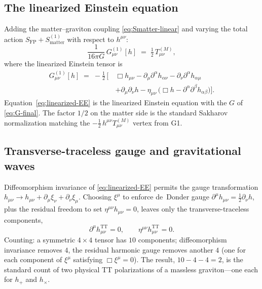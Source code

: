 \documentclass[11pt]{article}
\begin{document}
\subsection{The linearized Einstein equation}

Adding the matter--graviton coupling \eqref{eq:Smatter-linear} and
varying the total action $S_{\mathrm{FP}} +
S_{\mathrm{matter}}^{(1)}$ with respect to $h^{\mu\nu}$:
\begin{equation}
  \frac{1}{16\pi G}\,G^{(1)}_{\mu\nu}[h]
   \;=\;
   \tfrac{1}{2}\,T^{(M)}_{\mu\nu},
  \label{eq:linearized-EE}
\end{equation}
where the linearized Einstein tensor is
\begin{align}
  G^{(1)}_{\mu\nu}[h]
   \;=\; -\tfrac{1}{2}\,\Big[\,
     &\Box h_{\mu\nu}
     - \partial_\mu\partial^\alpha h_{\alpha\nu}
     - \partial_\nu\partial^\alpha h_{\alpha\mu} \nonumber\\
     & + \partial_\mu\partial_\nu h
     - \eta_{\mu\nu}\,\bigl(\Box h - \partial^\alpha\partial^\beta h_{\alpha\beta}\bigr)
   \Big].
   \label{eq:G-linear}
\end{align}
Equation~\eqref{eq:linearized-EE} is the linearized Einstein
equation with the $G$ of \eqref{eq:G-final}.  The factor $1/2$
on the matter side is the standard Sakharov normalization
matching the $-\tfrac{1}{2}\,h^{\mu\nu} T^{(M)}_{\mu\nu}$ vertex
from G1.

\subsection{Transverse-traceless gauge and gravitational waves}

Diffeomorphism invariance of \eqref{eq:linearized-EE} permits the
gauge transformation $h_{\mu\nu} \to h_{\mu\nu}
+ \partial_\mu \xi_\nu + \partial_\nu \xi_\mu$.  Choosing $\xi^\mu$
to enforce de~Donder gauge $\partial^\mu h_{\mu\nu} = \tfrac{1}{2}
\partial_\nu h$, plus the residual freedom to set
$\eta^{\mu\nu} h_{\mu\nu} = 0$, leaves only the
transverse-traceless components,
\begin{equation}
  \partial^\mu h^{\mathrm{TT}}_{\mu\nu} = 0,
  \qquad
  \eta^{\mu\nu} h^{\mathrm{TT}}_{\mu\nu} = 0.
  \label{eq:TT-gauge}
\end{equation}
Counting: a symmetric $4\times 4$ tensor has $10$ components;
diffeomorphism invariance removes $4$, the residual harmonic gauge
removes another $4$ (one for each component of $\xi^\mu$ satisfying
$\Box \xi^\mu = 0$).  The result, $10 - 4 - 4 = 2$, is the
standard count of two physical TT polarizations of a massless
graviton---one each for $h_+$ and $h_\times$.
\end{document}
